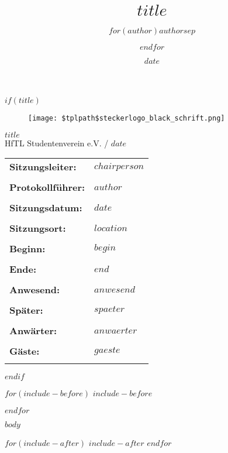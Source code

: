 \documentclass[a4paper,12pt,ngerman,titlepage,oneside]{$documentclass$}
\title{$title$}
\author{$for(author)$$author$$sep$ \and $endfor$}
\date{$date$}
\begin{document}
$if(title)$
	\thispagestyle{empty}
	\begin{titlepage}
		\thispagestyle{empty}
		\normalfont

        \vfill
        \begin{figure}[ht]
	       \centering
           \texttt{[image: \$tplpath\$steckerlogo\_black\_schrift.png]}
        \end{figure}
        \vfill
		\begin{center}
			\Huge\textbf{$title$}\\
      \Large HfTL Studentenverein e.V. / $date$
            \par
		\end{center}
		\vfill

		\begin{table}[htb]
		\begin{tabular}{lp{10cm}}
			\textbf{Sitzungsleiter:} & $chairperson$\\\\
			\textbf{Protokollführer:} & $author$\\\\
      \textbf{Sitzungsdatum:} & $date$\\\\
      \textbf{Sitzungsort:} & $location$\\\\
      \textbf{Beginn:} & $begin$\\\\
      \textbf{Ende:} & $end$\\\\
      \textbf{Anwesend:} & $anwesend$\\\\
      \textbf{Später:} & $spaeter$\\\\
      \textbf{Anwärter:} & $anwaerter$\\\\
      \textbf{Gäste:} & $gaeste$\\\\
		\end{tabular}
		\end{table}

	\vfill
\end{titlepage}
\clearpage
$endif$

$for(include-before)$
$include-before$

$endfor$

{
\hypersetup{linkcolor=black}
\setcounter{tocdepth}{$toc-depth$}
\clearpage
}

$body$

$for(include-after)$
$include-after$
$endfor$
\end{document}
